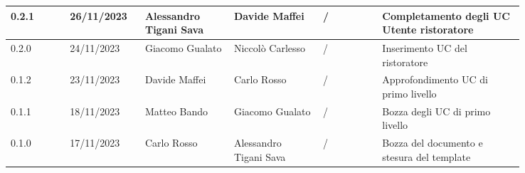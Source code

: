 {\begin{longtable}{p{0.10\linewidth}p{0.10\linewidth}p{0.15\linewidth}p{0.15\linewidth}p{0.10\linewidth}p{0.24\linewidth}}
	  \hline
	  0.2.1             & 26/11/2023    & Alessandro Tigani Sava & Davide Maffei          & /                      & Completamento degli UC Utente ristoratore                                \\
	  \hline
	  0.2.0             & 24/11/2023    & Giacomo Gualato        & Niccolò Carlesso       & /                      & Inserimento UC del ristoratore                                           \\
	  \hline
	  0.1.2             & 23/11/2023    & Davide Maffei          & Carlo Rosso            & /                      & Approfondimento UC di primo livello                                      \\
	  \hline
	  0.1.1             & 18/11/2023    & Matteo Bando           & Giacomo Gualato        & /                      & Bozza degli UC di primo livello                                          \\
	  \hline
	  0.1.0             & 17/11/2023    & Carlo Rosso            & Alessandro Tigani Sava & /                      & Bozza del documento e stesura del template                               \\
  \end{longtable}
 }
